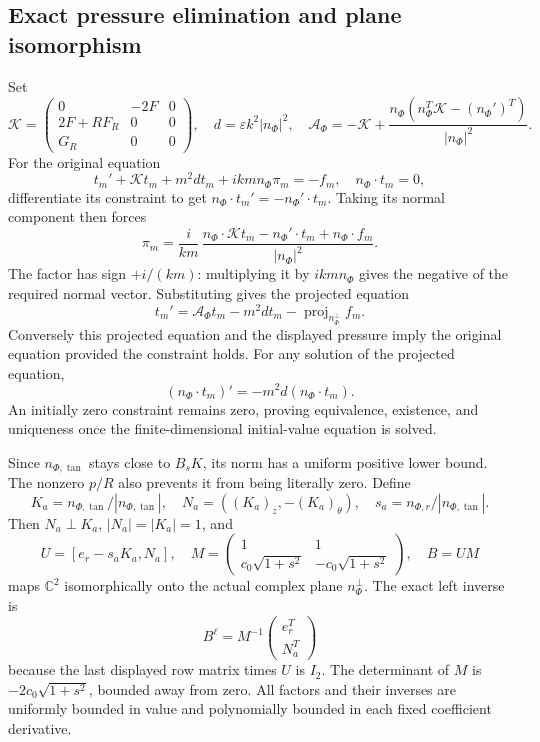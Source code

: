 \documentclass[10pt,a4paper]{article}
\begin{document}
\subsection{Exact pressure elimination and plane isomorphism}\label{exact-pressure-elimination-and-plane-isomorphism}

Set \[
\mathcal K=
\begin{pmatrix}0&-2F&0\\2F+RF_R&0&0\\G_R&0&0\end{pmatrix},
\quad d=\varepsilon k^2|n_\Phi|^2,\quad
\mathcal A_\Phi=-\mathcal K+
\frac{n_\Phi(n_\Phi^T\mathcal K-(n_\Phi')^T)}{|n_\Phi|^2}.
\] For the original equation \[
t_m'+\mathcal Kt_m+m^2dt_m+ikm n_\Phi\pi_m=-f_m,
\quad n_\Phi\cdot t_m=0,
\] differentiate its constraint to get \(n_\Phi\cdot t_m'=-n_\Phi'\cdot t_m\). Taking its normal component then forces \[
\pi_m=\frac{i}{km}\,
\frac{n_\Phi\cdot\mathcal Kt_m-n_\Phi'\cdot t_m+n_\Phi\cdot f_m}{|n_\Phi|^2}.
\] The factor has sign \(+i/(km)\): multiplying it by \(ikm n_\Phi\) gives the negative of the required normal vector. Substituting gives the projected equation \[
t_m'=\mathcal A_\Phi t_m-m^2dt_m-\operatorname{proj}_{n_\Phi^\perp}f_m.
\] Conversely this projected equation and the displayed pressure imply the original equation provided the constraint holds. For any solution of the projected equation, \[
(n_\Phi\cdot t_m)'=-m^2d(n_\Phi\cdot t_m).
\] An initially zero constraint remains zero, proving equivalence, existence, and uniqueness once the finite-dimensional initial-value equation is solved.

Since \(n_{\Phi,\tan}\) stays close to \(B_sK\), its norm has a uniform positive lower bound. The nonzero \(p/R\) also prevents it from being literally zero. Define \[
K_a=n_{\Phi,\tan}/|n_{\Phi,\tan}|,\quad
N_a=((K_a)_z,-(K_a)_\theta),\quad
s_a=n_{\Phi,r}/|n_{\Phi,\tan}|.
\] Then \(N_a\perp K_a\), \(|N_a|=|K_a|=1\), and \[
U=[e_r-s_aK_a,N_a],\quad
M=\begin{pmatrix}1&1\\c_0\sqrt{1+s^2}&-c_0\sqrt{1+s^2}\end{pmatrix},
\quad B=UM
\] maps \(\mathbb C^2\) isomorphically onto the actual complex plane \(n_\Phi^\perp\). The exact left inverse is \[
B^\ell=M^{-1}\begin{pmatrix}e_r^T\\N_a^T\end{pmatrix}
\] because the last displayed row matrix times \(U\) is \(I_2\). The determinant of \(M\) is \(-2c_0\sqrt{1+s^2}\), bounded away from zero. All factors and their inverses are uniformly bounded in value and polynomially bounded in each fixed coefficient derivative.
\end{document}
